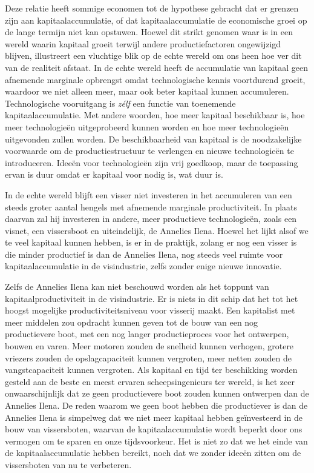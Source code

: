 \documentclass[
  a5paper,
  smalldemyvopaper,11pt,twoside,onecolumn,openright,extrafontsizes,
hidelinks]{memoir}
\begin{document}
Deze relatie heeft sommige economen tot de hypothese gebracht dat er
grenzen zijn aan kapitaalaccumulatie, of dat kapitaalaccumulatie de
economische groei op de lange termijn niet kan opstuwen. Hoewel dit
strikt genomen waar is in een wereld waarin kapitaal groeit terwijl
andere productiefactoren ongewijzigd blijven, illustreert een vluchtige
blik op de echte wereld om ons heen hoe ver dit van de realiteit
afstaat. In de echte wereld heeft de accumulatie van kapitaal geen
afnemende marginale opbrengst omdat technologische kennis voortdurend
groeit, waardoor we niet alleen meer, maar ook beter kapitaal kunnen
accumuleren. Technologische vooruitgang is \emph{zélf} een functie van
toenemende kapitaalaccumulatie. Met andere woorden, hoe meer kapitaal
beschikbaar is, hoe meer technologieën uitgeprobeerd kunnen worden en
hoe meer technologieën uitgevonden zullen worden. De beschikbaarheid van
kapitaal is de noodzakelijke voorwaarde om de productiestructuur te
verlengen en nieuwe technologieën te introduceren. Ideeën voor
technologieën zijn vrij goedkoop, maar de toepassing ervan is duur omdat
er kapitaal voor nodig is, wat duur is.

In de echte wereld blijft een visser niet investeren in het accumuleren
van een steeds groter aantal hengels met afnemende marginale
productiviteit. In plaats daarvan zal hij investeren in andere, meer
productieve technologieën, zoals een visnet, een vissersboot en
uiteindelijk, de Annelies Ilena. Hoewel het lijkt alsof we te veel
kapitaal kunnen hebben, is er in de praktijk, zolang er nog een visser
is die minder productief is dan de Annelies Ilena, nog steeds veel
ruimte voor kapitaalaccumulatie in de visindustrie, zelfs zonder enige
nieuwe innovatie.

Zelfs de Annelies Ilena kan niet beschouwd worden als het toppunt van
kapitaalproductiviteit in de visindustrie. Er is niets in dit schip dat
het tot het hoogst mogelijke productiviteitsniveau voor visserij maakt.
Een kapitalist met meer middelen zou opdracht kunnen geven tot de bouw
van een nog productievere boot, met een nog langer productieproces voor
het ontwerpen, bouwen en varen. Meer motoren zouden de snelheid kunnen
verhogen, grotere vriezers zouden de opslagcapaciteit kunnen vergroten,
meer netten zouden de vangstcapaciteit kunnen vergroten. Als kapitaal en
tijd ter beschikking worden gesteld aan de beste en meest ervaren
scheepsingenieurs ter wereld, is het zeer onwaarschijnlijk dat ze geen
productievere boot zouden kunnen ontwerpen dan de Annelies Ilena. De
reden waarom we geen boot hebben die productiever is dan de Annelies
Ilena is simpelweg dat we niet meer kapitaal hebben geïnvesteerd in de
bouw van vissersboten, waarvan de kapitaalaccumulatie wordt beperkt door
ons vermogen om te sparen en onze tijdsvoorkeur. Het is niet zo dat we
het einde van de kapitaalaccumulatie hebben bereikt, noch dat we zonder
ideeën zitten om de vissersboten van nu te verbeteren.
\end{document}
